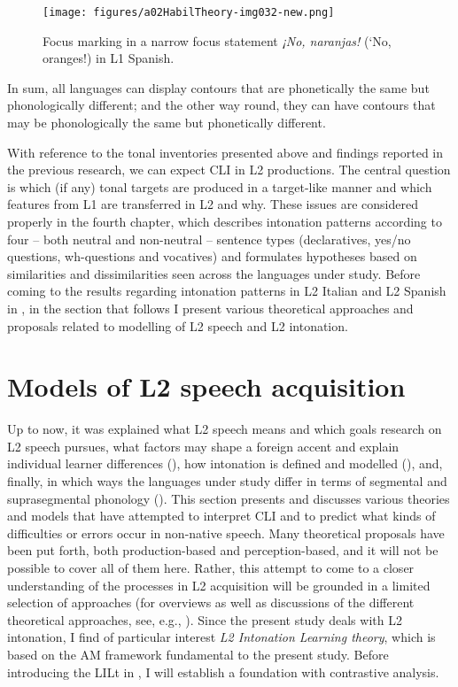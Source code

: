 \begin{figure}[p]
\texttt{[image: figures/a02HabilTheory-img032-new.png]}

\caption{Focus marking in a narrow focus statement \textit{¡No, naranjas!} (‘No, oranges!) in L1 Spanish.}
\label{fig:2.20}
\end{figure}

In sum, all languages can display contours that are phonetically the same but phonologically different; and the other way round, they can have contours that may be phonologically the same but phonetically different.


With reference to the tonal inventories presented above and findings reported in the previous research, we can expect CLI in L2 productions. The central question is which (if any) tonal targets are produced in a target-like manner and which features from L1 are transferred in L2 and why. These issues are considered properly in the fourth chapter, which describes intonation patterns according to four -- both neutral and non-neutral -- sentence types (declaratives, yes/no questions, wh-questions and vocatives) and formulates hypotheses based on similarities and dissimilarities seen across the languages under study. Before coming to the results regarding intonation patterns in L2 Italian and L2 Spanish in , in the section that follows I present various theoretical approaches and proposals related to modelling of L2 speech and L2 intonation.


\section{Models of L2 speech acquisition}\label{sec:2.4}
\largerpage
Up to now, it was explained what L2 speech means and which goals research on L2 speech pursues, what factors may shape a foreign accent and explain individual learner differences (), how intonation is defined and modelled (), and, finally, in which ways the languages under study differ in terms of segmental and suprasegmental phonology (). This section presents and discusses various theories and models that have attempted to interpret CLI and to predict what kinds of difficulties or errors occur in non-native speech. Many theoretical proposals have been put forth, both production-based and perception-based, and it will not be possible to cover all of them here. Rather, this attempt to come to a closer understanding of the processes in L2 acquisition will be grounded in a limited selection of approaches (for overviews as well as discussions of the different theoretical approaches, see, e.g., \citealt{Eckman2004, ColantoniEtAl2015, DerwingMunro2015}). Since the present study deals with L2 intonation, I find of particular interest  \textit{L2 Intonation Learning theory}, which is based on the AM framework fundamental to the present study. Before introducing the LILt in , I will establish a foundation with contrastive analysis.


